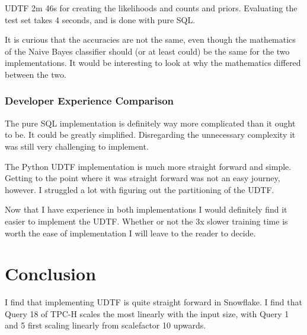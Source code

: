 \documentclass{article}
\begin{document}
\medskip \noindent UDTF 2m 46s for creating the likelihoods and counts and priors. Evaluating the test set takes 4 seconds, and is done with pure SQL. 

\medskip \noindent It is curious that the accuracies are not the same, even though the mathematics of the Naive Bayes classifier should (or at least could) be the same for the two implementations. It would be interesting to look at why the mathematics differed between the two. 

\subsubsection{Developer Experience Comparison}
The pure SQL implementation is definitely way more complicated than it ought to be. It could be greatly simplified. Disregarding the unnecessary complexity it was still very challenging to implement. 

\medskip \noindent The Python UDTF implementation is much more straight forward and simple. Getting to the point where it was straight forward was not an easy journey, however. I struggled a lot with figuring out the partitioning of the UDTF. 

\medskip \noindent Now that I have experience in both implementations I would definitely find it easier to implement the UDTF. Whether or not the 3x slower training time is worth the ease of implementation I will leave to the reader to decide. 

\section{Conclusion}
I find that implementing UDTF is quite straight forward in Snowflake. I find that Query 18 of TPC-H scales the most linearly with the input size, with Query 1 and 5 first scaling linearly from scalefactor 10 upwards. 


\newpage


\end{document}
